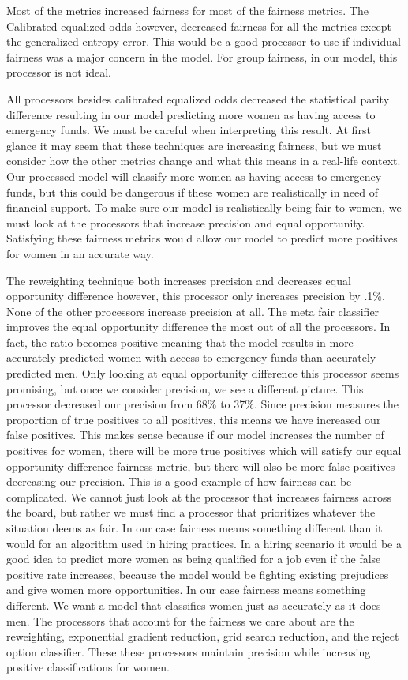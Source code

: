 \documentclass[water,article,submit,moreauthors,pdftex]{mdpi}
\begin{document}
Most of the metrics increased fairness for most of the fairness metrics.
The Calibrated equalized odds however, decreased fairness for all the
metrics except the generalized entropy error. This would be a good
processor to use if individual fairness was a major concern in the
model. For group fairness, in our model, this processor is not ideal.

All processors besides calibrated equalized odds decreased the
statistical parity difference resulting in our model predicting more
women as having access to emergency funds. We must be careful when
interpreting this result. At first glance it may seem that these
techniques are increasing fairness, but we must consider how the other
metrics change and what this means in a real-life context. Our processed
model will classify more women as having access to emergency funds, but
this could be dangerous if these women are realistically in need of
financial support. To make sure our model is realistically being fair to
women, we must look at the processors that increase precision and equal
opportunity. Satisfying these fairness metrics would allow our model to
predict more positives for women in an accurate way.

The reweighting technique both increases precision and decreases equal
opportunity difference however, this processor only increases precision
by .1\%. None of the other processors increase precision at all. The
meta fair classifier improves the equal opportunity difference the most
out of all the processors. In fact, the ratio becomes positive meaning
that the model results in more accurately predicted women with access to
emergency funds than accurately predicted men. Only looking at equal
opportunity difference this processor seems promising, but once we
consider precision, we see a different picture. This processor decreased
our precision from 68\% to 37\%. Since precision measures the proportion
of true positives to all positives, this means we have increased our
false positives. This makes sense because if our model increases the
number of positives for women, there will be more true positives which
will satisfy our equal opportunity difference fairness metric, but there
will also be more false positives decreasing our precision. This is a
good example of how fairness can be complicated. We cannot just look at
the processor that increases fairness across the board, but rather we
must find a processor that prioritizes whatever the situation deems as
fair. In our case fairness means something different than it would for
an algorithm used in hiring practices. In a hiring scenario it would be
a good idea to predict more women as being qualified for a job even if
the false positive rate increases, because the model would be fighting
existing prejudices and give women more opportunities. In our case
fairness means something different. We want a model that classifies
women just as accurately as it does men. The processors that account for
the fairness we care about are the reweighting, exponential gradient
reduction, grid search reduction, and the reject option classifier.
These these processors maintain precision while increasing positive
classifications for women.
\end{document}
